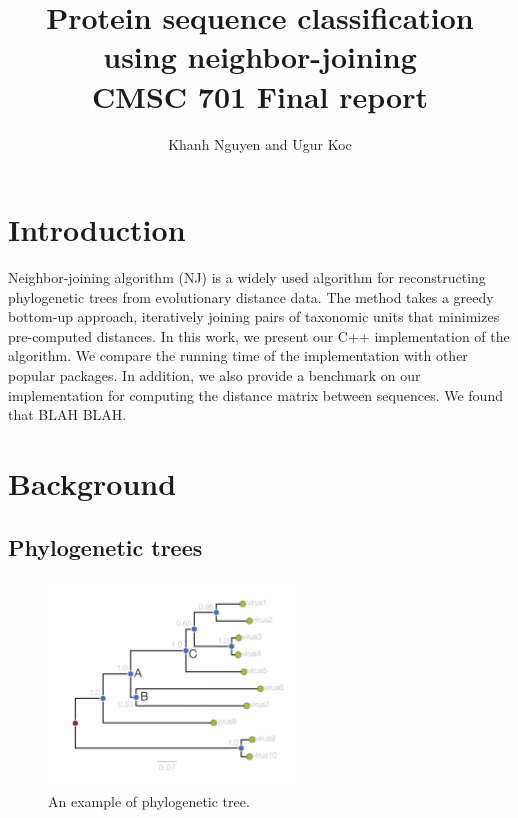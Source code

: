 \documentclass[11pt,letterpaper]{article}
\title{
Protein sequence classification using neighbor-joining\\
   CMSC 701 Final report
}
\author{
	Khanh Nguyen and Ugur Koc
}
\theoremstyle{definition}
\begin{document}
\maketitle

\section{Introduction}

Neighbor-joining algorithm (NJ) is a widely used algorithm for reconstructing phylogenetic trees from evolutionary distance data. The method takes a greedy bottom-up approach, iteratively joining pairs of taxonomic units that minimizes pre-computed distances. In this work, we present our C++ implementation of the algorithm. We compare the running time of the implementation with other popular packages. In addition, we also provide a benchmark on our implementation for computing the distance matrix between sequences. We found that BLAH BLAH.

\section{Background}


\subsection{Phylogenetic trees}

\begin{figure}[h]
  \centering
  \includegraphics[width=0.6\textwidth]{phylogram_1a.png}
  \caption{An example of phylogenetic tree.}
  \label{fig:phytree}
\end{figure}
\end{document}
